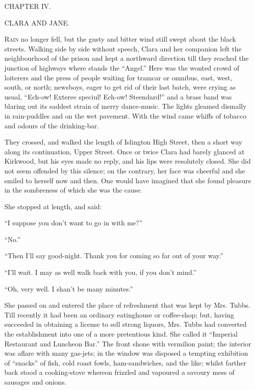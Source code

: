 {}

{CHAPTER IV.}

CLARA AND JANE.

\textsc{Rain} no longer fell, but the gusty and bitter wind still swept
about the black streets. Walking side by side without speech, Clara and
her companion left the neighbourhood of the prison and kept a northward
direction till they reached the junction of highways where stands the
``Angel.'' Here was the wonted crowd of loiterers and the press of
people waiting for tramcar or omnibus, east, west, south, or north;
newsboys, eager to get rid of their last batch, were crying as usual,
``Ech-ow! Exteree speciul! Ech-ow! Steendard!'' and a brass band was
blaring out its saddest strain of merry dance-music. The lights gleamed
dismally in rain-puddles and on the wet pavement. With the wind {}came
whiffs of tobacco and odours of the drinking-bar.

They crossed, and walked the length of Islington High Street, then a
short way along its continuation, Upper Street. Once or twice Clara had
barely glanced at Kirkwood, but his eyes made no reply, and his lips
were resolutely closed. She did not seem offended by this silence; on
the contrary, her face was cheerful and she smiled to herself now and
then. One would have imagined that she found pleasure in the sombreness
of which she was the cause.

She stopped at length, and said:

``I suppose you don't want to go in with me?''

``No.''

``Then I'll say good-night. Thank you for coming so far out of your
way.''

``I'll wait. I may as well walk back with you, if you don't mind.''

``Oh, very well. I shan't be many minutes.''

She passed on and entered the place of {}refreshment that was kept by
Mrs. Tubbs. Till recently it had been an ordinary eatinghouse or
coffee-shop; but, having succeeded in obtaining a license to sell strong
liquors, Mrs. Tubbs had converted the establishment into one of a more
pretentious kind. She called it ``Imperial Restaurant and Luncheon
Bar.'' The front shone with vermilion paint; the interior was aflare
with many gas-jets; in the window was disposed a tempting exhibition of
``snacks'' of fish, cold roast fowls, ham-sandwiches, and the like;
whilst farther back stood a cooking-stove whereon frizzled and vapoured
a savoury mess of sausages and onions.

